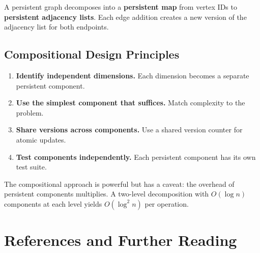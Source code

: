 A persistent graph decomposes into a \textbf{persistent map} from vertex IDs to \textbf{persistent adjacency lists}. Each edge addition creates a new version of the adjacency list for both endpoints.

\subsection{Compositional Design Principles}

\begin{enumerate}
    \item \textbf{Identify independent dimensions.} Each dimension becomes a separate persistent component.
    \item \textbf{Use the simplest component that suffices.} Match complexity to the problem.
    \item \textbf{Share versions across components.} Use a shared version counter for atomic updates.
    \item \textbf{Test components independently.} Each persistent component has its own test suite.
\end{enumerate}

The compositional approach is powerful but has a caveat: the overhead of persistent components multiplies. A two-level decomposition with $O(\log n)$ components at each level yields $O(\log^2 n)$ per operation.

\section{References and Further Reading}\label{sec21:references}

